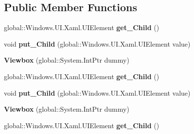 \subsection*{Public Member Functions}
\begin{DoxyCompactItemize}
\item 
\mbox{\label{class_windows_1_1_u_i_1_1_xaml_1_1_controls_1_1_viewbox_a40524be89c752d819130bc37f8d21c75}} 
global\+::\+Windows.\+U\+I.\+Xaml.\+U\+I\+Element {\bfseries get\+\_\+\+Child} ()
\item 
\mbox{\label{class_windows_1_1_u_i_1_1_xaml_1_1_controls_1_1_viewbox_a378c3b98440e0807fc9f12b3dc0ee44c}} 
void {\bfseries put\+\_\+\+Child} (global\+::\+Windows.\+U\+I.\+Xaml.\+U\+I\+Element value)
\item 
\mbox{\label{class_windows_1_1_u_i_1_1_xaml_1_1_controls_1_1_viewbox_ae6244c803bd36c5ac2d03e5b8e842f87}} 
{\bfseries Viewbox} (global\+::\+System.\+Int\+Ptr dummy)
\item 
\mbox{\label{class_windows_1_1_u_i_1_1_xaml_1_1_controls_1_1_viewbox_a40524be89c752d819130bc37f8d21c75}} 
global\+::\+Windows.\+U\+I.\+Xaml.\+U\+I\+Element {\bfseries get\+\_\+\+Child} ()
\item 
\mbox{\label{class_windows_1_1_u_i_1_1_xaml_1_1_controls_1_1_viewbox_a378c3b98440e0807fc9f12b3dc0ee44c}} 
void {\bfseries put\+\_\+\+Child} (global\+::\+Windows.\+U\+I.\+Xaml.\+U\+I\+Element value)
\item 
\mbox{\label{class_windows_1_1_u_i_1_1_xaml_1_1_controls_1_1_viewbox_ae6244c803bd36c5ac2d03e5b8e842f87}} 
{\bfseries Viewbox} (global\+::\+System.\+Int\+Ptr dummy)
\item 
\mbox{\label{class_windows_1_1_u_i_1_1_xaml_1_1_controls_1_1_viewbox_a40524be89c752d819130bc37f8d21c75}} 
global\+::\+Windows.\+U\+I.\+Xaml.\+U\+I\+Element {\bfseries get\+\_\+\+Child} ()

\end{DoxyCompactItemize}
